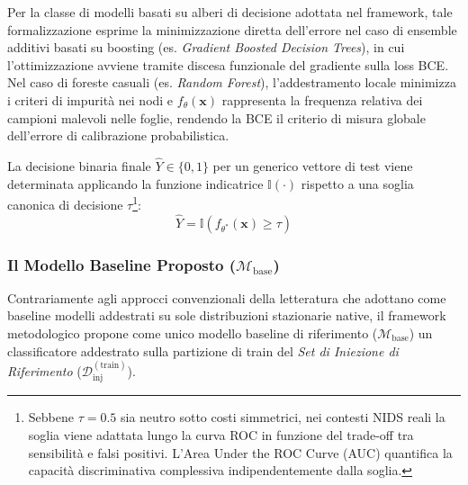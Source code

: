 Per la classe di modelli basati su alberi di decisione adottata nel framework, tale formalizzazione esprime la minimizzazione diretta dell'errore nel caso di ensemble additivi basati su boosting (es. \textit{Gradient Boosted Decision Trees}), in cui l'ottimizzazione avviene tramite discesa funzionale del gradiente sulla loss BCE. Nel caso di foreste casuali (es. \textit{Random Forest}), l'addestramento locale minimizza i criteri di impurità nei nodi e $f_\theta(\mathbf{x})$ rappresenta la frequenza relativa dei campioni malevoli nelle foglie, rendendo la BCE il criterio di misura globale dell'errore di calibrazione probabilistica.

La decisione binaria finale $\hat{Y} \in \{0, 1\}$ per un generico vettore di test viene determinata applicando la funzione indicatrice $\mathbb{I}(\cdot)$ rispetto a una soglia canonica di decisione $\tau$\footnote{Sebbene $\tau = 0.5$ sia neutro sotto costi simmetrici, nei contesti NIDS reali la soglia viene adattata lungo la curva ROC in funzione del trade-off tra sensibilità e falsi positivi. L'Area Under the ROC Curve (AUC) quantifica la capacità discriminativa complessiva indipendentemente dalla soglia.}: 
\begin{equation}
    \hat{Y} = \mathbb{I}\left(f_{\theta^*}(\mathbf{x}) \ge \tau\right)
    \label{eq:binary_decision}
\end{equation}

\subsubsection{Il Modello Baseline Proposto ($\mathcal{M}_{\text{base}}$)}
\label{subsubsec:modello_baseline}
Contrariamente agli approcci convenzionali della letteratura che adottano come baseline modelli addestrati su sole distribuzioni stazionarie native, il framework metodologico propone come unico modello baseline di riferimento ($\mathcal{M}_{\text{base}}$) un classificatore addestrato sulla partizione di train del \textit{Set di Iniezione di Riferimento} ($\mathcal{D}_{\text{inj}}^{(\text{train})}$).

